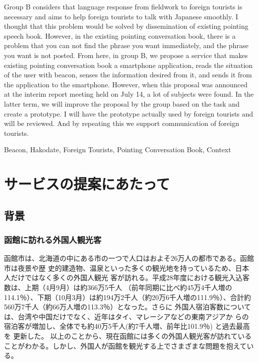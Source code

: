 \documentclass[11pt,papersize]{jsbook}
\begin{document}
\begin{eabstract}



 Group B considers that language response from fieldwork to foreign tourists is necessary and aims to help foreign tourists to talk with Japanese smoothly. I thought that this problem would be solved by dissemination of existing pointing speech book. However, in the existing pointing conversation book, there is a problem that you can not find the phrase you want immediately, and the phrase you want is not posted. From here, in group B, we propose a service that makes existing pointing conversation book a smartphone application, reads the situation of the user with beacon, senses the information desired from it, and sends it from the application to the smartphone. However, when this proposal was announced at the interim report meeting held on July 14, a lot of subjects were found. In the latter term, we will improve the proposal by the group based on the task and create a prototype. I will have the prototype actually used by foreign tourists and will be reviewed. And by repeating this we support communication of foreign tourists.

\begin{ekeyword}
  Beacon, Hakodate, Foreign Tourists, Pointing Conversation Book, Context
\end{ekeyword}

\end{eabstract}

\tableofcontents%


\mainmatter%




\chapter{サービスの提案にあたって}

\section{背景}

\subsection{函館に訪れる外国人観光客}
 函館市は、北海道の中にある市の一つで人口はおよそ26万人の都市である。函館市は夜景や歴
史的建造物、温泉といった多くの観光地を持っているため、日本人だけではなく多くの外国人観光
客が訪れる。平成28年度における観光入込客数は、上期（4月9月）は約366万5千人
（前年同期に比べ約45万4千人増の114.1％）、下期（10月3月）は約194万2千人（約20万6千人増の111.9％）、合計約560万7千人（約66万人増の113.3％）となった。さらに
外国人宿泊客数については、台湾や中国だけでなく、近年はタイ、マレーシアなどの東南アジアか
らの宿泊客が増加し、全体でも約40万5千人(約7千人増、前年比101.9％) と過去最高を
更新した\cite{b}。
以上のことから、現在函館には多くの外国人観光客が訪れていることがわかる。しかし、外国人が函館を観光する上でさまざまな問題を抱えている。
\end{document}
